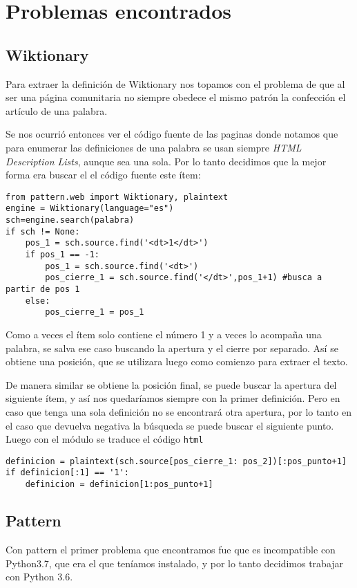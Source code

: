 \section{Problemas encontrados}
\subsection{Wiktionary}\label{wik}
Para extraer la definición de Wiktionary nos topamos con el problema de que al ser una página comunitaria no siempre obedece el mismo patrón la confección el artículo de una palabra. 

Se nos ocurrió entonces ver el código fuente de las paginas donde notamos que para enumerar las definiciones de una palabra se usan siempre \emph{HTML Description Lists}, aunque sea una sola. Por lo tanto decidimos que la mejor forma era buscar el el código fuente este ítem:
\begin{verbatim}
from pattern.web import Wiktionary, plaintext
engine = Wiktionary(language="es")
sch=engine.search(palabra)
if sch != None:
	pos_1 = sch.source.find('<dt>1</dt>')
	if pos_1 == -1:
		pos_1 = sch.source.find('<dt>')
		pos_cierre_1 = sch.source.find('</dt>',pos_1+1) #busca a partir de pos 1
	else:
		pos_cierre_1 = pos_1
\end{verbatim}
Como a veces el ítem solo contiene el número 1 y a veces lo acompaña una palabra, se salva ese caso buscando la apertura  y el cierre  por separado.
Así se obtiene una posición, que se utilizara luego como comienzo para extraer el texto.

De manera similar se obtiene la posición final, se puede buscar la apertura del siguiente ítem, y así nos quedaríamos siempre con la primer definición. Pero en caso que tenga una sola definición no se encontrará otra apertura, por lo tanto en el caso que devuelva negativa la búsqueda se puede buscar el siguiente punto.
Luego con el módulo  se traduce el código \texttt{html}
\begin{verbatim}
definicion = plaintext(sch.source[pos_cierre_1: pos_2])[:pos_punto+1]
if definicion[:1] == '1':
	definicion = definicion[1:pos_punto+1]
\end{verbatim}

\subsection{Pattern}\label{patt}
Con pattern el primer problema que encontramos fue que es incompatible con Python3.7, que era el que teníamos instalado, y por lo tanto decidimos trabajar con Python 3.6.

